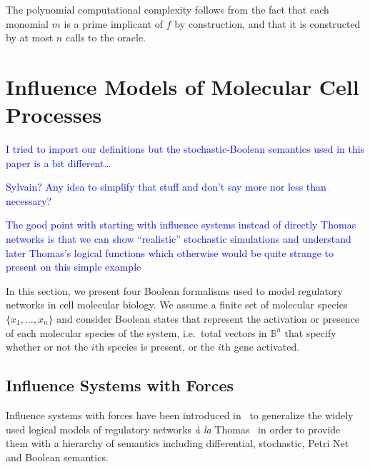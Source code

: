 \documentclass{llncs}
\newcommand{\francois}[1]{\textcolor{blue}{#1}}
\begin{document}
The polynomial computational complexity follows from the fact that each monomial $m$ is a prime implicant
of $f$ by construction, and that it is constructed by at most $n$ calls to the
oracle.




\section{Influence Models of Molecular Cell Processes}

\francois{I tried to import our definitions but the stochastic-Boolean semantics used in this paper is a bit different\dots}

\francois{Sylvain? Any idea to simplify that stuff and don't say more nor less than necessary?}

\francois{The good point with starting with influence systems instead of directly Thomas networks
is that we can show ``realistic'' stochastic simulations and understand later Thomas's logical functions
which otherwise would be quite strange to present on this simple example}


In this section, we present four Boolean formalisms used to model regulatory networks in cell molecular biology.
We assume a finite set of molecular species $\{x_1,\dots,x_n\}$ 
and consider Boolean states that represent the activation or presence of each molecular species of the system, 
i.e.~total vectors in $\mathbb{B}^n$ that specify whether or not the $i$th species is present, or the $i$th gene activated.

\subsection{Influence Systems with Forces}


Influence systems with forces have been introduced in~\cite{FMRS16cmsb}
to generalize the widely used logical models of regulatory networks \emph{\`a la} Thomas~\cite{Thomas73jtb} 
in order to provide them with a hierarchy of semantics
including differential, stochastic, Petri Net and Boolean semantics.
\end{document}
